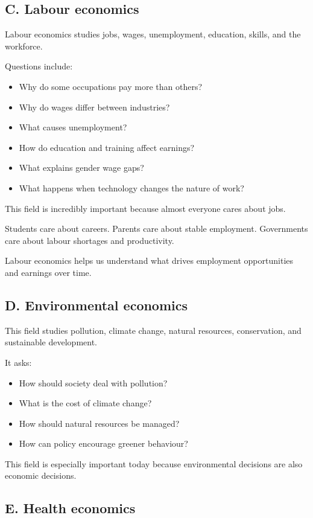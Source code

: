 \documentclass[12pt]{article}
\begin{document}
\subsection*{C. Labour economics}

Labour economics studies jobs, wages, unemployment, education, skills, and the workforce.

Questions include:
\begin{itemize}[leftmargin=2em]
    \item Why do some occupations pay more than others?
    \item Why do wages differ between industries?
    \item What causes unemployment?
    \item How do education and training affect earnings?
    \item What explains gender wage gaps?
    \item What happens when technology changes the nature of work?
\end{itemize}

This field is incredibly important because almost everyone cares about jobs.

Students care about careers.  
Parents care about stable employment.  
Governments care about labour shortages and productivity.

Labour economics helps us understand what drives employment opportunities and earnings over time.

\subsection*{D. Environmental economics}

This field studies pollution, climate change, natural resources, conservation, and sustainable development.

It asks:
\begin{itemize}[leftmargin=2em]
    \item How should society deal with pollution?
    \item What is the cost of climate change?
    \item How should natural resources be managed?
    \item How can policy encourage greener behaviour?
\end{itemize}

This field is especially important today because environmental decisions are also economic decisions.

\subsection*{E. Health economics}
\end{document}
